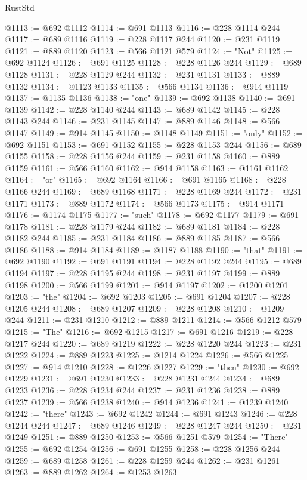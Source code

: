 \begin{lexlean}{RustStd}
\begin{coremodule}
@1113 := @692 @1112
@1114 := @691 @1113
@1116 := @228 @1114 @244
@1117 := @689 @1116
@1119 := @228 @1117 @244
@1120 := @231 @1119
@1121 := @889 @1120
@1123 := @566 @1121 @579
@1124 := "Not"
@1125 := @692 @1124
@1126 := @691 @1125
@1128 := @228 @1126 @244
@1129 := @689 @1128
@1131 := @228 @1129 @244
@1132 := @231 @1131
@1133 := @889 @1132
@1134 := @1123 @1133
@1135 := @566 @1134
@1136 := @914 @1119
@1137 := @1135 @1136
@1138 := "one"
@1139 := @692 @1138
@1140 := @691 @1139
@1142 := @228 @1140 @244
@1143 := @689 @1142
@1145 := @228 @1143 @244
@1146 := @231 @1145
@1147 := @889 @1146
@1148 := @566 @1147
@1149 := @914 @1145
@1150 := @1148 @1149
@1151 := "only"
@1152 := @692 @1151
@1153 := @691 @1152
@1155 := @228 @1153 @244
@1156 := @689 @1155
@1158 := @228 @1156 @244
@1159 := @231 @1158
@1160 := @889 @1159
@1161 := @566 @1160
@1162 := @914 @1158
@1163 := @1161 @1162
@1164 := "or"
@1165 := @692 @1164
@1166 := @691 @1165
@1168 := @228 @1166 @244
@1169 := @689 @1168
@1171 := @228 @1169 @244
@1172 := @231 @1171
@1173 := @889 @1172
@1174 := @566 @1173
@1175 := @914 @1171
@1176 := @1174 @1175
@1177 := "such"
@1178 := @692 @1177
@1179 := @691 @1178
@1181 := @228 @1179 @244
@1182 := @689 @1181
@1184 := @228 @1182 @244
@1185 := @231 @1184
@1186 := @889 @1185
@1187 := @566 @1186
@1188 := @914 @1184
@1189 := @1187 @1188
@1190 := "that"
@1191 := @692 @1190
@1192 := @691 @1191
@1194 := @228 @1192 @244
@1195 := @689 @1194
@1197 := @228 @1195 @244
@1198 := @231 @1197
@1199 := @889 @1198
@1200 := @566 @1199
@1201 := @914 @1197
@1202 := @1200 @1201
@1203 := "the"
@1204 := @692 @1203
@1205 := @691 @1204
@1207 := @228 @1205 @244
@1208 := @689 @1207
@1209 := @228 @1208
@1210 := @1209 @244
@1211 := @231 @1210
@1212 := @889 @1211
@1214 := @566 @1212 @579
@1215 := "The"
@1216 := @692 @1215
@1217 := @691 @1216
@1219 := @228 @1217 @244
@1220 := @689 @1219
@1222 := @228 @1220 @244
@1223 := @231 @1222
@1224 := @889 @1223
@1225 := @1214 @1224
@1226 := @566 @1225
@1227 := @914 @1210
@1228 := @1226 @1227
@1229 := "then"
@1230 := @692 @1229
@1231 := @691 @1230
@1233 := @228 @1231 @244
@1234 := @689 @1233
@1236 := @228 @1234 @244
@1237 := @231 @1236
@1238 := @889 @1237
@1239 := @566 @1238
@1240 := @914 @1236
@1241 := @1239 @1240
@1242 := "there"
@1243 := @692 @1242
@1244 := @691 @1243
@1246 := @228 @1244 @244
@1247 := @689 @1246
@1249 := @228 @1247 @244
@1250 := @231 @1249
@1251 := @889 @1250
@1253 := @566 @1251 @579
@1254 := "There"
@1255 := @692 @1254
@1256 := @691 @1255
@1258 := @228 @1256 @244
@1259 := @689 @1258
@1261 := @228 @1259 @244
@1262 := @231 @1261
@1263 := @889 @1262
@1264 := @1253 @1263

\end{coremodule}
\end{lexlean}
